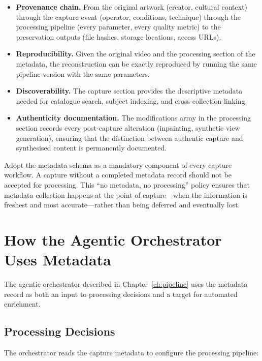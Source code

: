 \begin{itemize}
  \item \textbf{Provenance chain.} From the original artwork (creator, cultural context) through the capture event (operator, conditions, technique) through the processing pipeline (every parameter, every quality metric) to the preservation outputs (file hashes, storage locations, access URLs).
  \item \textbf{Reproducibility.} Given the original video and the processing section of the metadata, the reconstruction can be exactly reproduced by running the same pipeline version with the same parameters.
  \item \textbf{Discoverability.} The capture section provides the descriptive metadata needed for catalogue search, subject indexing, and cross-collection linking.
  \item \textbf{Authenticity documentation.} The modifications array in the processing section records every post-capture alteration (inpainting, synthetic view generation), ensuring that the distinction between authentic capture and synthesised content is permanently documented.
\end{itemize}

\begin{recommendation}
Adopt the metadata schema as a mandatory component of every capture workflow. A capture without a completed metadata record should not be accepted for processing. This ``no metadata, no processing'' policy ensures that metadata collection happens at the point of capture---when the information is freshest and most accurate---rather than being deferred and eventually lost.
\end{recommendation}

\section{How the Agentic Orchestrator Uses Metadata}
\label{sec:meta-agentic}

The agentic orchestrator described in Chapter~\ref{ch:pipeline} uses the metadata record as both an input to processing decisions and a target for automated enrichment.

\subsection{Processing Decisions}

The orchestrator reads the capture metadata to configure the processing pipeline:

